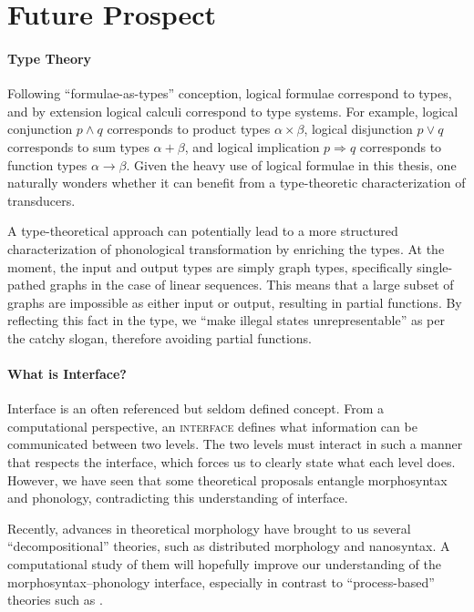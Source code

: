 \documentclass[12pt, a4paper]{report}
\newcommand{\textterm}[1]{\textsc{#1}\index{#1}}
\renewcommand{\implies}{\Rightarrow}
\begin{document}
\section{Future Prospect}
\paragraph{Type Theory}
Following  \enquote{formulae-as-types} conception,
logical formulae correspond to types, and by extension logical calculi
correspond to type systems.  For example, logical conjunction
\(p \land q\) corresponds to product types \(\alpha \times \beta\),
logical disjunction \(p \lor q\) corresponds to sum types
\(\alpha + \beta\), and logical implication \(p \implies q\)
corresponds to function types \(\alpha \to \beta\).  Given the heavy
use of logical formulae in this thesis, one naturally wonders whether
it can benefit from a type-theoretic characterization of transducers.

A type-theoretical approach can potentially lead to a more structured
characterization of phonological transformation by enriching the
types.  At the moment, the input and output types are simply graph
types, specifically single-pathed graphs in the case of linear
sequences.  This means that a large subset of graphs are impossible as
either input or output, resulting in partial functions.  By reflecting
this fact in the type, we \enquote{make illegal states
  unrepresentable} as per the catchy slogan, therefore avoiding
partial functions.

\paragraph{What is Interface?}
Interface is an often referenced but seldom defined concept.  From a
computational perspective, an \textterm{interface} defines what
information can be communicated between two levels.  The two levels
must interact in such a manner that respects the interface, which
forces us to clearly state what each level does.  However, we have
seen that some theoretical proposals entangle morphosyntax and
phonology, contradicting this understanding of interface.

Recently, advances in theoretical morphology have brought to us
several \enquote{decompositional} theories, such as
 distributed morphology and 
nanosyntax.  A computational study of them will hopefully improve our
understanding of the morphosyntax--phonology interface, especially in
contrast to \enquote{process-based} theories such as \textcite{a92am}.
\end{document}
